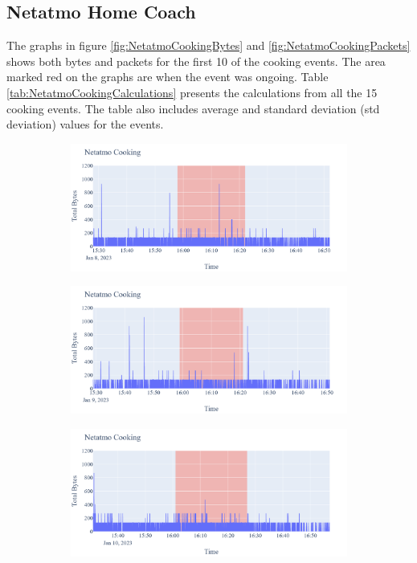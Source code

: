 \subsection{Netatmo Home Coach}
The graphs in figure \ref{fig:NetatmoCookingBytes} and \ref{fig:NetatmoCookingPackets} shows both bytes and packets for the first 10 of the cooking events. The area marked red on the graphs are when the event was ongoing. Table \ref{tab:NetatmoCookingCalculations} presents the calculations from all the 15 cooking events. The table also includes average and standard deviation (std deviation) values for the events. 

\begin{figure}[H]
    \begin{subfigure}[b]{0.5\textwidth}
        \centering
        \includegraphics[width=1.2\hsize]{figures/Netatmo_Cooking_Bytes_08.01.png}
    \end{subfigure}
    \begin{subfigure}[b]{0.5\textwidth}
        \centering
        \includegraphics[width=1.2\hsize]{figures/Netatmo_Cooking_Bytes_09.01.png}
    \end{subfigure}
    \begin{subfigure}[b]{0.5\textwidth}
        \centering
        \includegraphics[width=1.2\hsize]{figures/Netatmo_Cooking_Bytes_10.01.png}

\end{subfigure}
\end{figure}
